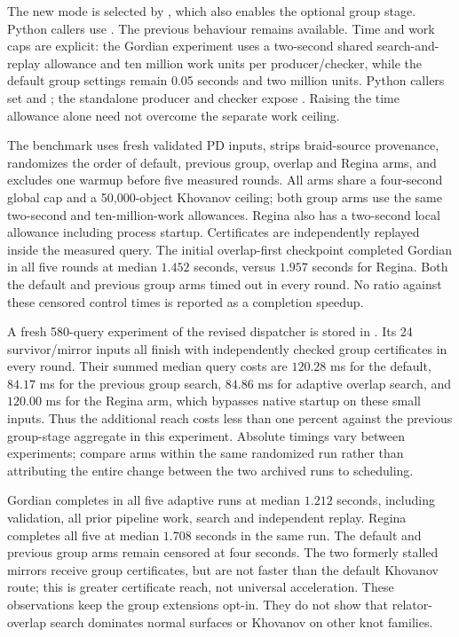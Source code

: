 The new mode is selected by , which also enables
the optional group stage.  Python callers use
.  The previous 
behaviour remains available.  Time and work caps are explicit: the Gordian
experiment uses a two-second shared search-and-replay allowance and ten
million work units per producer/checker, while the default group settings
remain 0.05 seconds and two million units.  Python callers set
 and ; the standalone producer
and checker expose .  Raising the time allowance alone
need not overcome the separate work ceiling.

The benchmark uses fresh validated PD inputs, strips braid-source
provenance, randomizes the order of default, previous group, overlap and
Regina arms, and excludes one warmup before five measured rounds.  All
arms share a four-second global cap and a 50,000-object Khovanov ceiling;
both group arms use the same two-second and ten-million-work allowances.
Regina also has a two-second local allowance including process startup.
Certificates are independently replayed inside the measured query.
The initial overlap-first checkpoint completed Gordian in all five rounds
at median $1.452$ seconds, versus $1.957$ seconds for Regina.  Both the
default and previous group arms timed out in every round.  No ratio
against these censored control times is reported as a completion speedup.

A fresh 580-query experiment of the revised dispatcher is stored in
.  Its 24 survivor/mirror
inputs all finish with independently checked group certificates in every
round.  Their summed median query costs are $120.28$ ms for the default,
$84.17$ ms for the previous group search, $84.86$ ms for adaptive overlap
search, and $120.00$ ms for the Regina arm, which bypasses native startup
on these small inputs.  Thus the additional reach costs less than one
percent against the previous group-stage aggregate in this experiment.
Absolute timings vary between experiments; compare arms within the same
randomized run rather than attributing the entire change between the two
archived runs to scheduling.

Gordian completes in all five adaptive runs at median $1.212$ seconds,
including validation, all prior pipeline work, search and independent
replay.  Regina completes all five at median $1.708$ seconds in the same
run.  The default and previous group arms remain censored at four seconds.
The two formerly stalled mirrors receive group certificates, but are not
faster than the default Khovanov route; this is greater certificate reach,
not universal acceleration.  These observations keep the group extensions
opt-in.  They do not show that relator-overlap search dominates normal
surfaces or Khovanov on other knot families.
